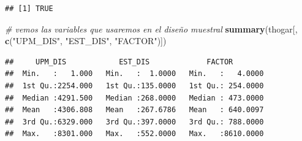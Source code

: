 \documentclass[
]{article}
\newenvironment{Shaded}{\begin{snugshade}}{\end{snugshade}}
\newcommand{\CommentTok}[1]{\textcolor[rgb]{0.56,0.35,0.01}{\textit{#1}}}
\newcommand{\DecValTok}[1]{\textcolor[rgb]{0.00,0.00,0.81}{#1}}
\newcommand{\KeywordTok}[1]{\textcolor[rgb]{0.13,0.29,0.53}{\textbf{#1}}}
\newcommand{\NormalTok}[1]{#1}
\newcommand{\OperatorTok}[1]{\textcolor[rgb]{0.81,0.36,0.00}{\textbf{#1}}}
\newcommand{\StringTok}[1]{\textcolor[rgb]{0.31,0.60,0.02}{#1}}
\begin{document}
\begin{Shaded}
\end{Shaded}

\begin{verbatim}
## [1] TRUE
\end{verbatim}

\begin{Shaded}
\begin{Highlighting}[]
\CommentTok{# vemos las variables que usaremos en el diseño muestral}
\KeywordTok{summary}\NormalTok{(thogar[, }\KeywordTok{c}\NormalTok{(}\StringTok{"UPM_DIS"}\NormalTok{, }\StringTok{"EST_DIS"}\NormalTok{, }\StringTok{"FACTOR"}\NormalTok{)])}
\end{Highlighting}
\end{Shaded}

\begin{verbatim}
##     UPM_DIS            EST_DIS             FACTOR         
##  Min.   :   1.000   Min.   :  1.0000   Min.   :   4.0000  
##  1st Qu.:2254.000   1st Qu.:135.0000   1st Qu.: 254.0000  
##  Median :4291.500   Median :268.0000   Median : 473.0000  
##  Mean   :4306.808   Mean   :267.6786   Mean   : 640.0097  
##  3rd Qu.:6329.000   3rd Qu.:397.0000   3rd Qu.: 788.0000  
##  Max.   :8301.000   Max.   :552.0000   Max.   :8610.0000
\end{verbatim}
\end{document}
